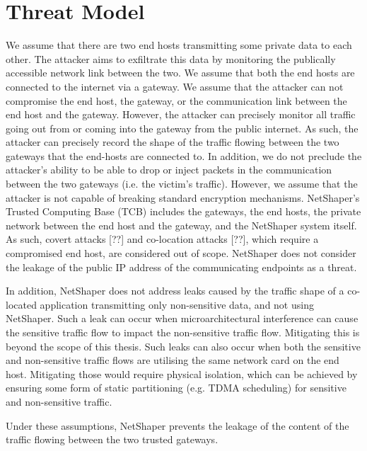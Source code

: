 \section{Threat Model}
\label{sec:netshaper-threat-model}

We assume that there are two end hosts transmitting some private data to each other.
The attacker aims to exfiltrate this data by monitoring the publically accessible network link between the two.
We assume that both the end hosts are connected to the internet via a gateway.
We assume that the attacker can not compromise the end host, the gateway, or the communication link between the end host and the gateway.
However, the attacker can precisely monitor all traffic going out from or coming into the gateway from the public internet. 
As such, the attacker can precisely record the shape of the traffic flowing between the two gateways that the end-hosts are connected to.
In addition, we do not preclude the attacker's ability to be able to drop or inject packets in the communication between the two gateways (i.e. the victim's traffic).
However, we assume that the attacker is not capable of breaking standard encryption mechanisms.
NetShaper's Trusted Computing Base (TCB) includes the gateways, the end hosts, the private network between the end host and the gateway, and the NetShaper system itself.
As such, covert attacks [??] and co-location attacks [??], which require a compromised end host, are considered out of scope.
NetShaper does not consider the leakage of the public IP address of the communicating endpoints as a threat.

In addition, NetShaper does not address leaks caused by the traffic shape of a co-located application transmitting only non-sensitive data, and not using NetShaper.
Such a leak can occur when microarchitectural interference can cause the sensitive traffic flow to impact the non-sensitive traffic flow. Mitigating this is beyond the scope of this thesis.
Such leaks can also occur when both the sensitive and non-sensitive traffic flows are utilising the same network card on the end host.
Mitigating those would require physical isolation, which can be achieved by ensuring some form of static partitioning (e.g. TDMA scheduling) for sensitive and non-sensitive traffic.

Under these assumptions, NetShaper prevents the leakage of the content of the traffic flowing between the two trusted gateways.